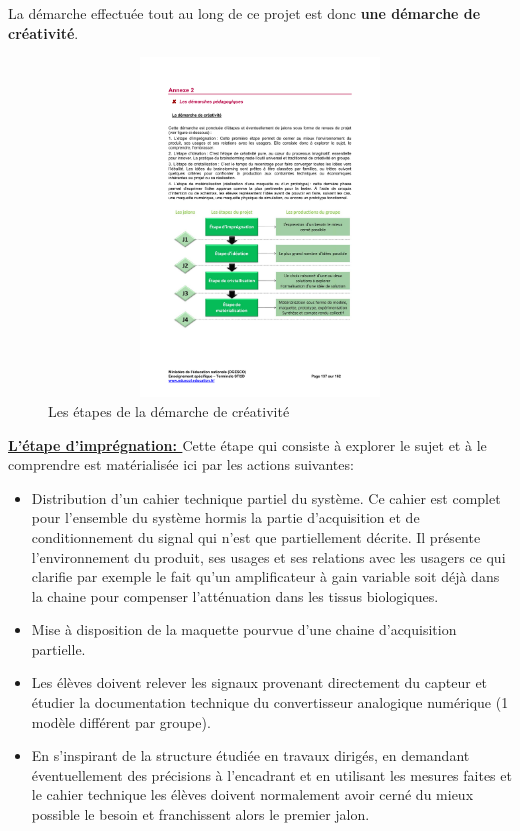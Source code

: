 \documentclass[12pt]{article}
\begin{document}
La démarche effectuée tout au long de ce projet est donc \textbf{une démarche de créativité}.
\begin{figure}[!h]
\centering
\includegraphics[width=17cm,height=9cm,trim=1cm 5cm 1cm 12.8cm, clip=true]{Images_Rapport/demarche_creativite}
\caption{Les étapes de la démarche de créativité}
\end{figure}

\vspace{10pt}

\textbf{\underline{L'étape d'imprégnation: }} Cette étape qui consiste à explorer le sujet et à le comprendre est matérialisée ici par les actions suivantes:


\begin{itemize}
\item Distribution d'un cahier technique partiel du système. Ce cahier est complet pour l'ensemble du système hormis la partie d'acquisition et de conditionnement du signal qui n'est que partiellement décrite. Il présente l'environnement du produit, ses usages et ses relations avec les usagers ce qui clarifie par exemple le fait qu'un amplificateur à gain variable soit déjà dans la chaine pour compenser l'atténuation dans les tissus biologiques.

\item  Mise à disposition de la maquette pourvue d'une chaine d'acquisition partielle.
\item Les élèves doivent relever les signaux provenant directement du capteur et étudier la documentation technique du convertisseur analogique numérique (1 modèle différent par groupe). 

\item En s'inspirant de la structure étudiée en travaux dirigés, en demandant éventuellement des précisions à l'encadrant et en utilisant les mesures faites et le cahier technique les élèves doivent normalement avoir cerné du mieux possible le besoin et franchissent alors le premier jalon.

\end{itemize}
\end{document}
